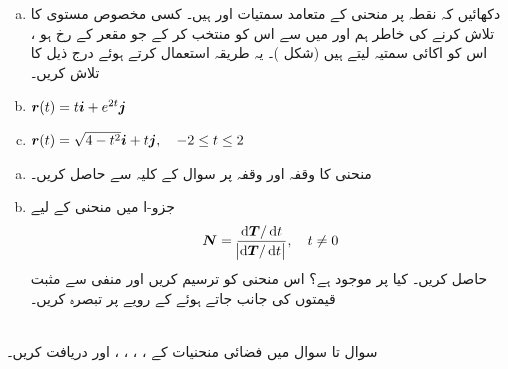 \begin{enumerate}[a.]
\item
دکھائیں کہ نقطہ   پر منحنی   کے متعامد سمتیات  اور  ہیں۔
کسی مخصوص مستوی کا      تلاش کرنے کی خاطر ہم    اور  میں سے اس کو  منتخب کر کے  جو   مقعر کے  رخ ہو   ، اس کو اکائی سمتیہ  لیتے ہیں  (شکل )۔ یہ طریقہ استعمال کرتے ہوئے درج ذیل کا  تلاش کریں۔
\item
${{\boldsymbol{r}}}(t)=t{\boldsymbol{i}}+e^{2t}{\boldsymbol{j}}$
\item
${{\boldsymbol{r}}}(t)=\sqrt{4-t^2}{\boldsymbol{i}}+t{\boldsymbol{j}},\quad -2\le t\le 2$
\end{enumerate}
\begin{enumerate}[a.]
\item
منحنی  کا   وقفہ  اور وقفہ   پر  سوال  کے کلیہ سے حاصل کریں۔
\item
جزو-ا میں منحنی کے لیے 
\begin{align*}
\kvec{N}=\frac{\dif\kvec{T}/\dif t}{\abs{\dif\kvec{T}/\dif t}},\quad t\ne 0
\end{align*}
حاصل کریں۔ کیا  پر  موجود ہے؟ اس منحنی کو ترسیم کریں اور منفی سے مثبت قیمتوں کی  جانب  جاتے ہوئے      کے رویے  پر تبصرہ کریں۔
\end{enumerate}

\\
سوال  تا سوال  میں فضائی منحنیات کے ، ، ،  ، اور  دریافت کریں۔

